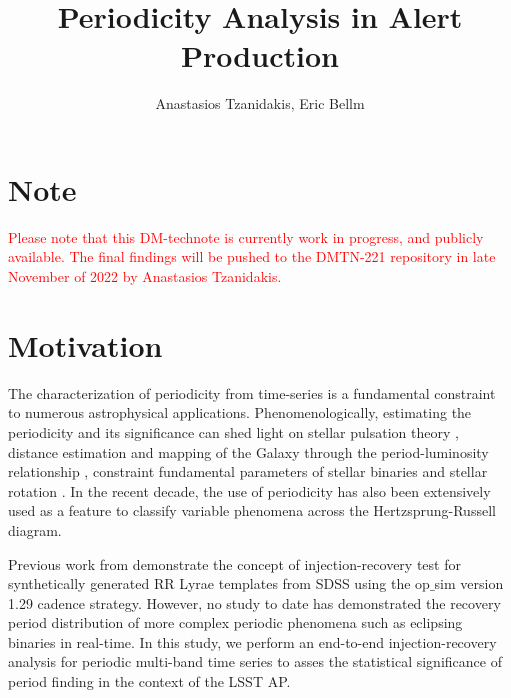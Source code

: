 \documentclass[DM,authoryear,toc]{lsstdoc}
\title{Periodicity Analysis in Alert Production}
\author{%
Anastasios Tzanidakis, Eric Bellm
}
\date{\vcsDate}
\begin{document}
\maketitle


\section{Note}
\textcolor{red}{Please note that this DM-technote is currently work in progress, and publicly available. The final findings will be pushed to the DMTN-221 repository in late November of 2022 by Anastasios Tzanidakis.}


\section{Motivation}
The characterization of periodicity from time-series is a fundamental constraint to numerous astrophysical applications. Phenomenologically, estimating the periodicity and its significance can shed light on stellar pulsation theory \citep{Antonello:Antonello81}, distance estimation and mapping of the Galaxy through the period-luminosity relationship \citep{Skowron:Skowron2019}, constraint fundamental parameters of stellar binaries \citep{Farinella:Farinella1979} and stellar rotation \citep{Walkowicz:Walkowicz13}. In the recent decade, the use of periodicity has also been extensively used as a feature to classify variable phenomena \citep{Richards:R13} across the Hertzsprung-Russell diagram. 

Previous work from \cite{2012AJ....144....9O} demonstrate the concept of injection-recovery test for synthetically generated RR Lyrae templates from SDSS using the op$\_$sim version 1.29 cadence strategy. However, no study to date has demonstrated the recovery period distribution of more complex periodic phenomena such as eclipsing binaries in real-time. In this study, we perform an end-to-end injection-recovery analysis for periodic multi-band time series to asses the statistical significance of period finding in the context of the LSST AP.
\end{document}
